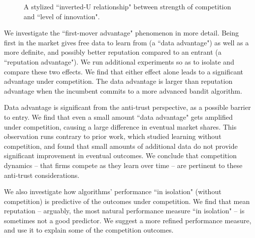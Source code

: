 \documentclass[format=acmsmall, review=false]{acmart}
\theoremstyle{definition}
\newcommand{\xhdr}[1]{\vspace{1mm} \noindent{\bf #1}}
\begin{document}
\begin{figure}[t]
\begin{center}
 \caption{A stylized ``inverted-U relationship" between strength of competition and ``level of innovation".}
\label{fig:inverted-U}
\end{center}
\end{figure}

\xhdr{Additional findings.}
We investigate the ``first-mover advantage" phenomenon in more detail. Being first in the market gives free data to learn from (a ``data advantage") as well as a more definite, and possibly better reputation compared to an entrant (a ``reputation advantage"). We run additional experiments so as to isolate and compare these two effects. We find that either effect alone leads to a significant advantage under competition. The data advantage is larger than reputation advantage when the incumbent commits to a more advanced bandit algorithm.

Data advantage is significant from the anti-trust perspective, as a possible barrier to entry. We find that even a small amount ``data advantage" gets amplified under competition, causing a large difference in eventual market shares. This observation runs contrary to prior work,  %
which studied learning without competition, and found that small amounts of additional data do not provide significant improvement in eventual outcomes. We conclude that competition dynamics -- that firms compete as they learn over time -- are pertinent to these anti-trust considerations.

We also investigate how algorithms' performance ``in isolation" (without competition) is predictive of the outcomes under competition. We find that mean reputation -- arguably, the most natural performance measure ``in isolation" -- is sometimes not a good predictor. We suggest a
more refined performance measure, and use it to explain some of the competition outcomes.
\end{document}
